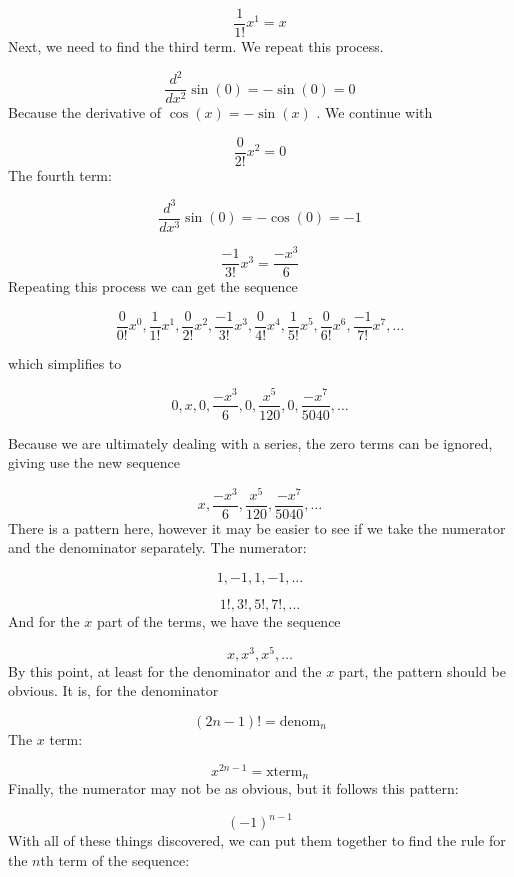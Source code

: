 $$\frac{1}{1!}x^1=x$$ Next, we need to find the third term. We repeat this process.



$$\frac{d^2}{dx^2}\sin(0)=-\sin(0)=0$$ Because the derivative of $\cos(x)=-\sin(x)$ . We continue with



$$\frac{0}{2!}x^2=0$$ The fourth term:



$$\frac{d^3}{dx^3}\sin(0)=-\cos(0)=-1$$



$$\frac{-1}{3!}x^3=\frac{-x^3}{6}$$ Repeating this process we can get the sequence



$$\frac{0}{0!}x^0,\frac{1}{1!}x^1,\frac{0}{2!}x^2,\frac{-1}{3!}x^3,\frac{0}{4!}x^4,\frac{1}{5!}x^5,\frac{0}{6!}x^6,\frac{-1}{7!}x^7,\dots$$

which simplifies to



$$0,x,0,\frac{-x^3}{6},0,\frac{x^5}{120},0,\frac{-x^7}{5040},\dots$$

Because we are ultimately dealing with a series, the zero terms can be ignored, giving use the new sequence



$$x,\frac{-x^3}{6},\frac{x^5}{120},\frac{-x^7}{5040},\dots$$ There is a pattern here, however it may be easier to see if we take the numerator and the denominator separately. The numerator:



$$1,-1,1,-1,\dots$$



$$1!,3!,5!,7!,\dots$$ And for the $x$ part of the terms, we have the sequence



$$x,x^3,x^5,\dots$$ By this point, at least for the denominator and the $x$ part, the pattern should be obvious. It is, for the denominator



$$(2n-1)!=\text{denom} _n$$ The $x$ term:



$$x^{2n-1}=\text{xterm} _n$$ Finally, the numerator may not be as obvious, but it follows this pattern:



$$(-1)^{n-1}$$ With all of these things discovered, we can put them together to find the rule for the $n$th term of the sequence:



